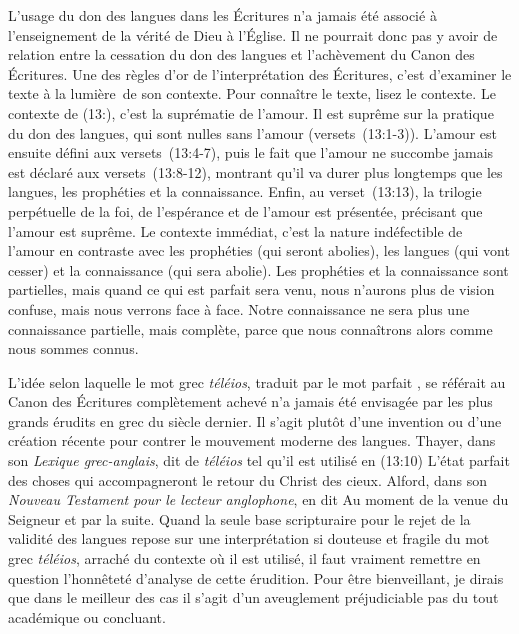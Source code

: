 L'usage du don des langues dans les Écritures n'a jamais été associé
 à l'enseignement de la vérité de Dieu à l'Église.
 Il ne pourrait donc pas y avoir de relation entre la cessation
 du don des langues et l'achèvement du Canon des Écritures.
 Une des règles d'or de l'interprétation des Écritures, c'est d'examiner
 le texte à la lumière~de son contexte. Pour connaître le texte,
 lisez le contexte. Le contexte de (13:), c'est la suprématie
 de l'amour. Il est suprême sur la pratique du don des langues,
 qui sont nulles sans l'amour (versets~(13:1-3)).
 L'amour est ensuite défini aux versets~(13:4-7),
 puis le fait que l'amour ne succombe jamais est déclaré aux
 versets~(13:8-12), montrant qu'il va durer plus longtemps
 que les langues, les prophéties et la connaissance.
 Enfin, au verset~(13:13), la trilogie perpétuelle de la foi,
 de l'espérance et de l'amour est présentée, précisant que l'amour
 est suprême. Le contexte immédiat, c'est la nature indéfectible de l'amour
 en contraste avec les prophéties (qui seront abolies), les langues
 (qui vont cesser) et la connaissance (qui sera abolie).
 Les prophéties et la connaissance sont partielles, mais quand ce qui
 est parfait sera venu, nous n'aurons plus de vision confuse,
 mais nous verrons face à face. Notre connaissance ne sera plus
 une connaissance partielle, mais complète, parce que nous connaîtrons
 alors comme nous sommes connus.

L'idée selon laquelle le mot grec \emph{téléios}, traduit par le mot \Og parfait \Fg{},
 se référait au Canon des Écritures complètement achevé n'a jamais été envisagée par
 les plus grands érudits en grec du siècle dernier.
 Il s'agit plutôt d'une invention ou d'une création récente pour contrer
 le mouvement moderne des langues. Thayer, dans son
 \emph{Lexique grec-anglais},
 dit de \emph{téléios} tel qu'il est utilisé en (13:10)\frcolon{}
 \Og L'état parfait des choses qui accompagneront le retour du Christ
 des cieux. \Fg{} Alford, dans son \emph{Nouveau Testament pour le lecteur
 anglophone}, en dit\frcolon{} \Og Au moment de la venue du Seigneur et par la suite. \Fg{}
 Quand la seule base scripturaire pour le rejet de la validité des langues
 repose sur une interprétation si douteuse et fragile du mot grec
 \emph{téléios}, arraché du contexte où il est utilisé, il faut vraiment
 remettre en question l'honnêteté d'analyse de cette érudition.
 Pour être bienveillant, je dirais que dans le meilleur des cas il s'agit
 d'un aveuglement préjudiciable \ocadr pas du tout académique ou concluant.

